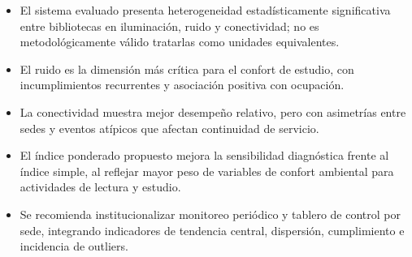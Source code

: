 
\begin{itemize}
\item El sistema evaluado presenta heterogeneidad estadísticamente significativa entre bibliotecas en iluminación, ruido y conectividad; no es metodológicamente válido tratarlas como unidades equivalentes.
\item El ruido es la dimensión más crítica para el confort de estudio, con incumplimientos recurrentes y asociación positiva con ocupación.
\item La conectividad muestra mejor desempeño relativo, pero con asimetrías entre sedes y eventos atípicos que afectan continuidad de servicio.
\item El índice ponderado propuesto mejora la sensibilidad diagnóstica frente al índice simple, al reflejar mayor peso de variables de confort ambiental para actividades de lectura y estudio.
\item Se recomienda institucionalizar monitoreo periódico y tablero de control por sede, integrando indicadores de tendencia central, dispersión, cumplimiento e incidencia de outliers.
\end{itemize}
